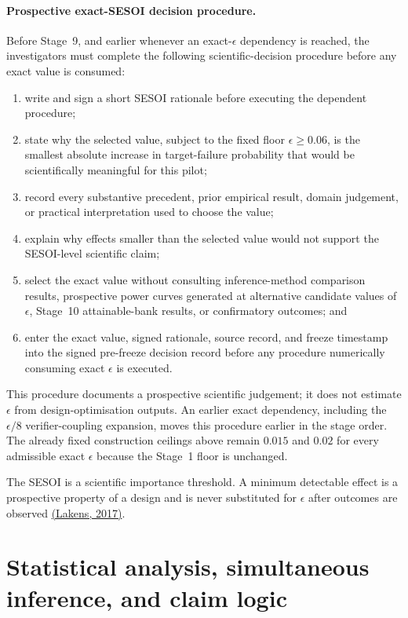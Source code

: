 \documentclass[11pt,a4paper]{article}
\begin{document}
\paragraph{Prospective exact-SESOI decision procedure.}
Before Stage~9, and earlier whenever an exact-$\epsilon$ dependency is reached, the investigators must complete the following scientific-decision procedure before any exact value is consumed:
\begin{enumerate}
\item write and sign a short SESOI rationale before executing the dependent procedure;
\item state why the selected value, subject to the fixed floor $\epsilon\ge0.06$, is the smallest absolute increase in target-failure probability that would be scientifically meaningful for this pilot;
\item record every substantive precedent, prior empirical result, domain judgement, or practical interpretation used to choose the value;
\item explain why effects smaller than the selected value would not support the SESOI-level scientific claim;
\item select the exact value without consulting inference-method comparison results, prospective power curves generated at alternative candidate values of $\epsilon$, Stage~10 attainable-bank results, or confirmatory outcomes; and
\item enter the exact value, signed rationale, source record, and freeze timestamp into the signed pre-freeze decision record before any procedure numerically consuming exact $\epsilon$ is executed.
\end{enumerate}
This procedure documents a prospective scientific judgement; it does not estimate $\epsilon$ from design-optimisation outputs. An earlier exact dependency, including the $\epsilon/8$ verifier-coupling expansion, moves this procedure earlier in the stage order. The already fixed construction ceilings above remain $0.015$ and $0.02$ for every admissible exact $\epsilon$ because the Stage~1 floor is unchanged.

The SESOI is a scientific importance threshold. A minimum detectable effect is a prospective property of a design and is never substituted for $\epsilon$ after outcomes are observed \href{https://doi.org/10.1177/1948550617697177}{(Lakens, 2017)}.

\section{Statistical analysis, simultaneous inference, and claim logic}\label{sec:analysis}
\end{document}
